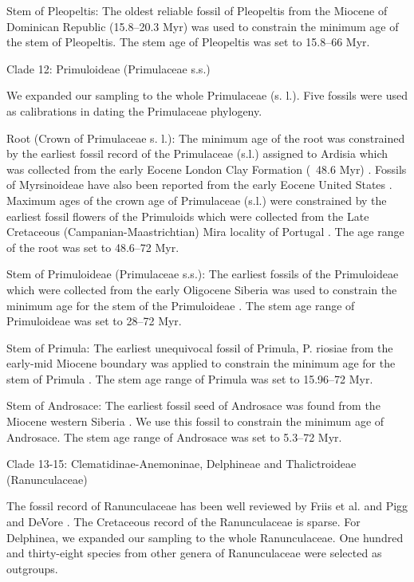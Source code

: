 \documentclass[10pt]{article}
\begin{document}
Stem of Pleopeltis: The oldest reliable fossil of Pleopeltis from the
Miocene of Dominican Republic (15.8--20.3 Myr) \citep{Schneider2015}
was used to constrain the minimum age of the stem of Pleopeltis. The
stem age of Pleopeltis was set to 15.8--66 Myr.

Clade 12: Primuloideae (Primulaceae s.s.)

We expanded our sampling to the whole Primulaceae (s. l.). Five
fossils were used as calibrations in dating the Primulaceae
phylogeny. 

Root (Crown of Primulaceae s. l.): The minimum age of the root was
constrained by the earliest fossil record of the Primulaceae (s.l.)
assigned to Ardisia which was collected from the early Eocene London
Clay Formation (~48.6 Myr) \citep{Collinson1984}. Fossils of
Myrsinoideae have also been reported from the early Eocene United
States \citep{Irving1971}. Maximum ages of the crown age of
Primulaceae (s.l.) were constrained by the earliest fossil flowers of
the Primuloids which were collected from the Late Cretaceous
(Campanian-Maastrichtian) Mira locality of Portugal
\citep{Friis2011}. The age range of the root was set to 48.6--72 Myr.

Stem of Primuloideae (Primulaceae s.s.): The earliest fossils of the
Primuloideae which were collected from the early Oligocene Siberia was
used to constrain the minimum age for the stem of the Primuloideae
\citep{Nikitin2006}. The stem age range of Primuloideae was set to
28--72 Myr.

Stem of Primula: The earliest unequivocal fossil of Primula,
P. riosiae from the early-mid Miocene boundary was applied to
constrain the minimum age for the stem of Primula
\citep{deVos2014}. The stem age range of Primula was set to 15.96--72
Myr.

Stem of Androsace: The earliest fossil seed of Androsace was found
from the Miocene western Siberia \citep{Dorofeev1963}. We use this
fossil to constrain the minimum age of Androsace. The stem age range
of Androsace was set to 5.3--72 Myr.

Clade 13-15: Clematidinae-Anemoninae, Delphineae and Thalictroideae
(Ranunculaceae)

The fossil record of Ranunculaceae has been well reviewed by Friis et
al. \citep{Friis2011} and Pigg and DeVore \citep{Pigg2005}. The
Cretaceous record of the Ranunculaceae is sparse. For Delphinea, we
expanded our sampling to the whole Ranunculaceae. One hundred and
thirty-eight species from other genera of Ranunculaceae were selected
as outgroups.
\end{document}
